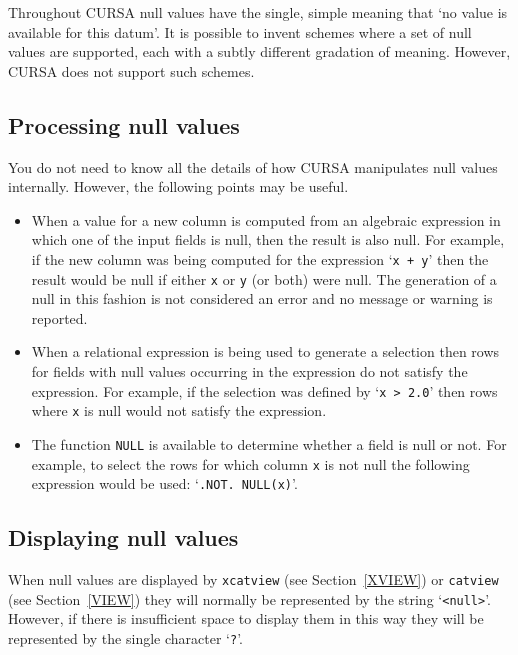 \documentclass[twoside,11pt]{article}
\renewcommand{\_}{\texttt{\symbol{95}}}
\begin{document}
Throughout CURSA null values have the single, simple meaning that `no value
is available for this datum'. It is possible to invent schemes where a set
of null values are supported, each with a subtly different gradation of
meaning. However, CURSA does not support such schemes.

\subsection{Processing null values}

You do not need to know all the details of how CURSA manipulates null
values internally. However, the following points may be useful.

\begin{itemize}

  \item When a value for a new column is computed from an algebraic
   expression in which one of the input fields is null, then the
   result is also null. For example, if the new column was being
   computed for the expression `{\tt x + y}' then the result would be
   null if either {\tt x} or {\tt y} (or both) were null. The generation
   of a null in this fashion is not considered an error and no message
   or warning is reported.

  \item When a relational expression is being used to generate a selection
   then rows for fields with null values occurring in the expression do not
   satisfy the expression. For example, if the selection was defined by
   `{\tt x > 2.0}' then rows where {\tt x} is null would not satisfy
   the expression.

  \item The function {\tt NULL} is available to determine whether a
   field is null or not. For example, to select the rows for which
   column {\tt x} is not null the following expression would be used:
   `{\tt .NOT. NULL(x)}'.

\end{itemize}

\subsection{Displaying null values}

When null values are displayed by {\tt xcatview} (see
Section~\ref{XVIEW}) or {\tt catview} (see Section~\ref{VIEW}) they
will normally be represented by the string `{\tt <null>}'. However, if
there is insufficient space to display them in this way they will be
represented by the single character `{\tt ?}'.
\end{document}
